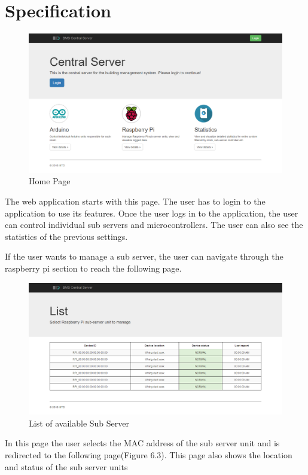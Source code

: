 \documentclass[letterpaper,11pt]{report}
\begin{document}
\chapter{Specification}\label{chapter:Specification}
\onehalfspacing
\begin{figure}[h]
\includegraphics[width=\textwidth]{index}
\centering
\captionsetup{justification=centering}
\caption{Home Page}
\label{fig:index}
\end{figure}
The web application starts with this page. The user has to login to the application to use its features. Once the user logs in to the application, the user can control individual sub servers and microcontrollers. The user can also see the statistics of the previous settings.
\par If the user wants to manage a sub server, the user can navigate through the raspberry pi section to reach the following page.
\newpage
\begin{figure}[h]
\includegraphics[width=\textwidth]{list}
\centering
\captionsetup{justification=centering}
\caption{List of available Sub Server}
\label{fig:list}
\end{figure}
In this page the user selects the MAC address of the sub server unit and is redirected to the following page(Figure 6.3). This page also shows the location and status of the sub server units
\end{document}
